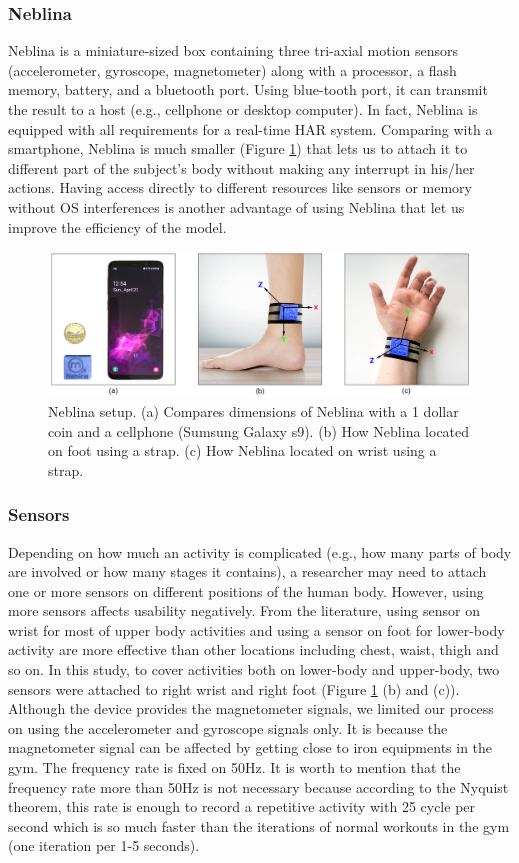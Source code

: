 \documentclass[journal,article,submit,moreauthors,pdftex]{Definitions/mdpi}
\begin{document}
\subsubsection{Neblina}
Neblina is a miniature-sized box containing three tri-axial motion sensors (accelerometer, gyroscope, magnetometer) along with a processor, a flash memory, battery, and a bluetooth port. Using blue-tooth port, it can transmit the result to a host (e.g., cellphone or desktop computer).  In fact, Neblina is equipped with all requirements for a real-time HAR system. Comparing with a smartphone, Neblina is much smaller (Figure \ref{neblina_setup}) that lets us to attach it to different part of the subject's body without making any interrupt in his/her actions\cite{de2018comparative}. Having access directly to different resources like sensors or memory without OS interferences is another advantage of using Neblina that let us improve the efficiency of the model.
\begin{figure}[H]
	\centering
	\includegraphics[width=10 cm]{Definitions/images/neblina_setup.jpg}
	\caption{Neblina setup. (a) Compares dimensions of Neblina with a 1 dollar coin and a cellphone (Sumsung Galaxy s9). (b) How Neblina located on foot using a strap. (c) How Neblina located on wrist using a strap.}
	\label{neblina_setup}
\end{figure} 
\subsubsection{Sensors} 
Depending on how much an activity is complicated (e.g., how many parts of body are involved or how many stages it contains), a researcher may need to attach one or more sensors on different positions of the human body. However, using more sensors affects usability negatively. From the literature, using sensor on wrist for most of upper body activities and using a sensor on foot for lower-body activity are more effective than other locations including chest, waist, thigh and so on. In this study, to cover activities both on lower-body and upper-body, two sensors were attached to right wrist and right foot (Figure \ref{neblina_setup} (b) and (c)). Although the device provides the magnetometer signals, we limited our process on using the accelerometer and gyroscope signals only. It is because the magnetometer signal can be affected by getting close to iron equipments in the gym. The frequency rate is fixed on 50Hz. It is worth to mention that the frequency rate more than 50Hz is not necessary because according to the Nyquist theorem, this rate is enough to record a repetitive activity with 25 cycle per second which is so much faster than the iterations of normal workouts in the gym (one iteration per 1-5 seconds).\\
\end{document}
